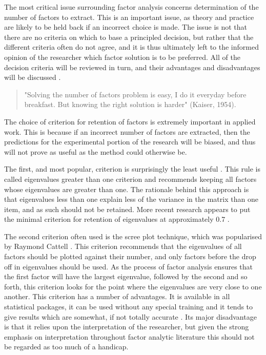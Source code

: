 
The most critical issue surrounding factor analysis concerns determination of the number of factors to extract\cite{zwick1986comparison}.  This is an important issue, as theory and practice are likely to be held back if an incorrect choice is made.  The issue is not that there are no criteria on which to base a principled decision, but rather that the different criteria often do not agree, and it is thus ultimately left to the informed opinion of the researcher which factor solution is to be preferred.  All of the decision criteria will be reviewed in turn, and their advantages and disadvantages will be discussed \cite{henson2006use}. 

\begin{quotation}
  "Solving the number of factors problem is
     easy, I do it everyday before breakfast.  But knowing the right
     solution is harder" (Kaiser, 1954).
\end{quotation}

The choice of criterion for retention of factors is extremely important in applied work. This is because if an incorrect number of factors are extracted, then the predictions for the experimental portion of the research will be biased, and thus will not prove as useful as the method could otherwise be. 

The first, and most popular, criterion is surprisingly the least useful \cite{zwick1986comparison}. This rule is called eigenvalues greater than one criterion and recommends keeping all factors whose eigenvalues are greater than one. The rationale behind this approach is that eigenvalues less than one explain less of the variance in the matrix than one item, and as such should not be retained.  More recent research appears to put the minimal criterion for retention of eigenvalues at approximately 0.7 \cite{henson2006use}. 

The second criterion often used is the scree plot technique, which was popularised by Raymond Cattell . This criterion recommends that the eigenvalues of all factors should be plotted against their number, and only factors before the drop off in eigenvalues should be used. As the process of factor analysis ensures that the first factor will have the largest eigenvalue, followed by the second and so forth, this criterion looks for the point where the eigenvalues are very close to one another.  This criterion has a number of advantages.  It is available in all statistical packages, it can be used without any special training and it tends to give results which are somewhat, if not totally accurate \cite{zwick1986comparison}.  Its major disadvantage is that it relies upon the interpretation of the researcher, but given the strong emphasis on interpretation throughout factor analytic literature this should not be regarded as too much of a handicap.

